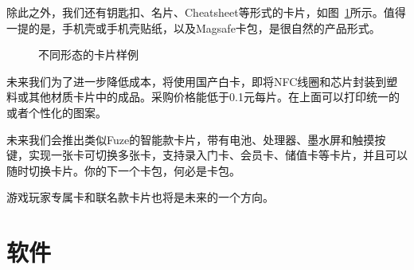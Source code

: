 \documentclass[UTF8]{ctexart}
\begin{document}
除此之外，我们还有钥匙扣、名片、Cheatsheet等形式的卡片，如图~\ref{Card}所示。值得一提的是，手机壳或手机壳贴纸，以及Magsafe卡包，是很自然的产品形式。

\begin{figure}[htbp]
    \centering
    \caption{不同形态的卡片样例}
    \label{Card}
\end{figure}

未来我们为了进一步降低成本，将使用国产白卡，即将NFC线圈和芯片封装到塑料或其他材质卡片中的成品。采购价格能低于0.1元每片。在上面可以打印统一的或者个性化的图案。

未来我们会推出类似Fuze的智能款卡片，带有电池、处理器、墨水屏和触摸按键，实现一张卡可切换多张卡，支持录入门卡、会员卡、储值卡等卡片，并且可以随时切换卡片。你的下一个卡包，何必是卡包。

游戏玩家专属卡和联名款卡片也将是未来的一个方向。

\section{软件}
\end{document}
